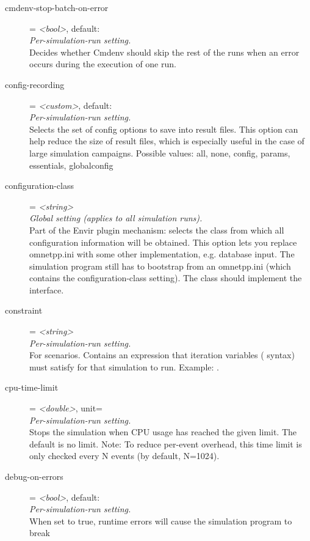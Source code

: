 \begin{description}
\item[cmdenv-stop-batch-on-error] = \textit{<bool>}, default: \\
    \textit{Per-simulation-run setting.}\\
    Decides whether Cmdenv should skip the rest of the runs when an error
    occurs during the execution of one run.
\item[config-recording] = \textit{<custom>}, default: \\
    \textit{Per-simulation-run setting.}\\
    Selects the set of config options to save into result files. This option
    can help reduce the size of result files, which is especially useful in the
    case of large simulation campaigns. Possible values: all, none, config,
    params, essentials, globalconfig
\item[configuration-class] = \textit{<string>}\\
    \textit{Global setting (applies to all simulation runs).}\\
    Part of the Envir plugin mechanism: selects the class from which all
    configuration information will be obtained. This option lets you replace
    omnetpp.ini with some other implementation, e.g. database input. The
    simulation program still has to bootstrap from an omnetpp.ini (which
    contains the configuration-class setting). The class should implement the
     interface.
\item[constraint] = \textit{<string>}\\
    \textit{Per-simulation-run setting.}\\
    For scenarios. Contains an expression that iteration variables
    (\ttt{\$\{{\allowbreak}\}{\allowbreak}} syntax) must satisfy for that
    simulation to run. Example: .
\item[cpu-time-limit] = \textit{<double>}, unit=\\
    \textit{Per-simulation-run setting.}\\
    Stops the simulation when CPU usage has reached the given limit. The
    default is no limit. Note: To reduce per-event overhead, this time limit is
    only checked every N events (by default, N=1024).
\item[debug-on-errors] = \textit{<bool>}, default: \\
    \textit{Per-simulation-run setting.}\\
    When set to true, runtime errors will cause the simulation program to break

\end{description}
